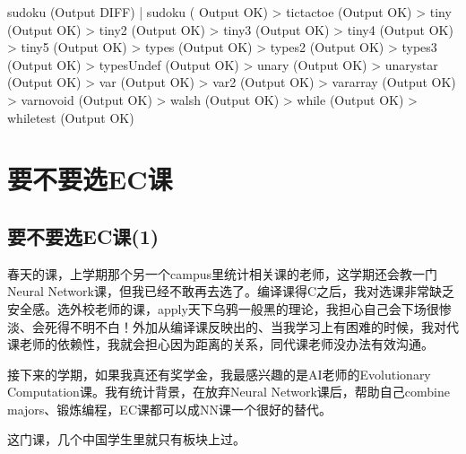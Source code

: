 \documentclass[12pt]{book}
\begin{document}
sudoku (Output DIFF)                                      |    sudoku (
Output OK)
                                              >    tictactoe (Output OK)
                                              >    tiny (Output OK)
                                              >    tiny2 (Output OK)
                                              >    tiny3 (Output OK)
                                              >    tiny4 (Output OK)
                                              >    tiny5 (Output OK)
                                              >    types (Output OK)
                                              >    types2 (Output OK)
                                              >    types3 (Output OK)
                                              >    typesUndef (Output OK)
                                              >    unary (Output OK)
                                              >    unarystar (Output OK)
                                              >    var (Output OK)
                                              >    var2 (Output OK)
                                              >    vararray (Output OK)
                                              >    varnovoid (Output OK)
                                              >    walsh (Output OK)
                                              >    while (Output OK)
                                              >    whiletest (Output OK)

\chapter{要不要选EC课}
\label{sec-14}
\section{要不要选EC课(1)}
\label{sec-14-1}

春天的课，上学期那个另一个campus里统计相关课的老师，这学期还会教一门Neural Network课，但我已经不敢再去选了。编译课得C之后，我对选课非常缺乏安全感。选外校老师的课，apply天下乌鸦一般黑的理论，我担心自己会下场很惨淡、会死得不明不白！外加从编译课反映出的、当我学习上有困难的时候，我对代课老师的依赖性，我就会担心因为距离的关系，同代课老师没办法有效沟通。

接下来的学期，如果我真还有奖学金，我最感兴趣的是AI老师的Evolutionary Computation课。我有统计背景，在放弃Neural Network课后，帮助自己combine majors、锻炼编程，EC课都可以成NN课一个很好的替代。

这门课，几个中国学生里就只有板块上过。
\end{document}

